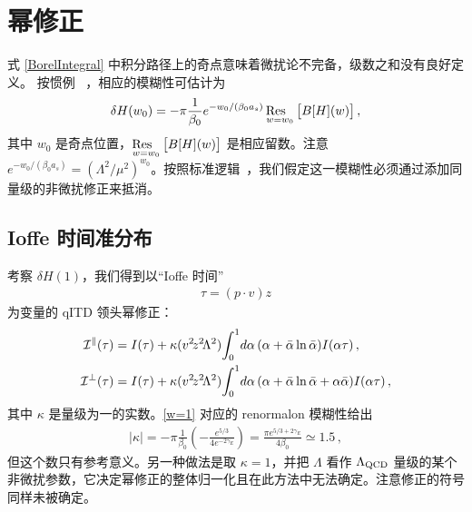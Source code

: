 \section{幂修正}\label{sect_powercorrections}%
%

式 \eqref{BorelIntegral} 中积分路径上的奇点意味着微扰论不完备，级数之和没有良好定义。
按惯例 ~\cite{Beneke:1998ui}，相应的模糊性可估计为
\begin{align}
\delta H(w_0)  = -\pi \frac{1}{\beta_0}  e^{-w_0/(\beta_0 a_s)} \operatorname*{\text{Res~~}}_{w=w_0}\big[B[H](w)\big]\,,
\end{align}
其中 $w_0$ 是奇点位置，$\displaystyle{\operatorname*{\text{Res~~}}_{w=w_0}\big[B[H](w)\big]}$ 是相应留数。注意 $ e^{-w_0/(\beta_0 a_s)} = (\Lambda^2/\mu^2)^{w_0}$。按照标准逻辑~\cite{Beneke:1998ui,Beneke:2000kc}，我们假定这一模糊性必须通过添加同量级的非微扰修正来抵消。

%
\subsection{Ioffe 时间准分布}\label{sect_qITD}%
%

考察 $\delta H(1)$，我们得到以``Ioffe 时间''
\begin{align}
 \tau = (p\cdot v) z
\end{align}
为变量的 qITD 领头幂修正：
\begin{align}
\label{t4-qITD}
  \mathcal{I}^\parallel(\tau)
&= I(\tau) +
  \kappa (v^2\! z^2\!\Lambda^2)\! \int_0^1\!d\alpha \, (\alpha + \bar\alpha \ln \bar\alpha)I(\alpha \tau )\,,
\notag\\
  \mathcal{I}^\perp(\tau)
&= I(\tau) +
  \kappa (v^2\! z^2\!\Lambda^2) \!\int_0^1\!d\alpha \, (\alpha + \bar\alpha \ln \bar\alpha + \alpha\bar\alpha)I(\alpha \tau )\,,
\end{align}
其中 $\kappa$ 是量级为一的实数。\eqref{w=1} 对应的 renormalon 模糊性给出
\begin{align}
  |\kappa| = -\pi \frac{1}{\beta_0}\left(- \frac{ e^{5/3}}{4 e^{-2\gamma_E}}\right) = \frac{\pi e^{5/3+2\gamma_E}}{4 \beta_0} \simeq 1.5\,,
\end{align}
但这个数只有参考意义。另一种做法是取 $\kappa=1$，并把 $\Lambda$ 看作 $\Lambda_{\rm QCD}$ 量级的某个非微扰参数，它决定幂修正的整体归一化且在此方法中无法确定。注意修正的符号同样未被确定。


